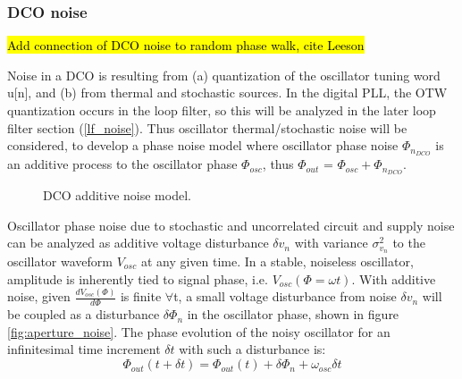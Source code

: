 \subsubsection{DCO noise}
	\hl{Add connection of DCO noise to random phase walk, cite Leeson}

	Noise in a DCO is resulting from (a) quantization of the oscillator tuning word u[n], and (b) from thermal and stochastic sources. In the digital PLL, the OTW quantization occurs in the loop filter, so this will be analyzed in the later loop filter section (\ref{lf_noise}). Thus oscillator thermal/stochastic noise will be considered, to develop a phase noise model where oscillator phase noise $\Phi_{n_{DCO}}$ is an additive process to the oscillator phase $\Phi_{osc}$, thus $\Phi_{out}$ = $\Phi_{osc} + \Phi_{n_{DCO}}$.

	\begin{figure}[htb!]
		\center
		\caption{DCO additive noise model.}
		\label{fig:dco_noise}
	\end{figure}
	\FloatBarrier

	 Oscillator phase noise due to stochastic and uncorrelated circuit and supply noise can be analyzed as additive voltage disturbance $\delta v_n$ with variance $\sigma_{v_n}^2$ to the oscillator waveform $V_{osc}$ at any given time.  In a stable, noiseless oscillator, amplitude is inherently tied to signal phase, i.e. $V_{osc}(\Phi=\omega t)$. With additive noise, given $\frac{dV_{osc}(\Phi)}{d\Phi}$ is finite $\forall$t, a small voltage disturbance from noise $\delta v_{n}$ will be coupled as a disturbance $\delta\Phi_{n}$ in the oscillator phase, shown in figure \ref{fig:aperture_noise}. The phase evolution of the noisy oscillator for an infinitesimal time increment $\delta t$  with such a disturbance is:
	 \begin{equation}
		\Phi_{out}(t+\delta t) = \Phi_{out}(t) + \delta\Phi_n + \omega_{osc}\delta t \label{eq:rwalk_ph}
	 \end{equation}


